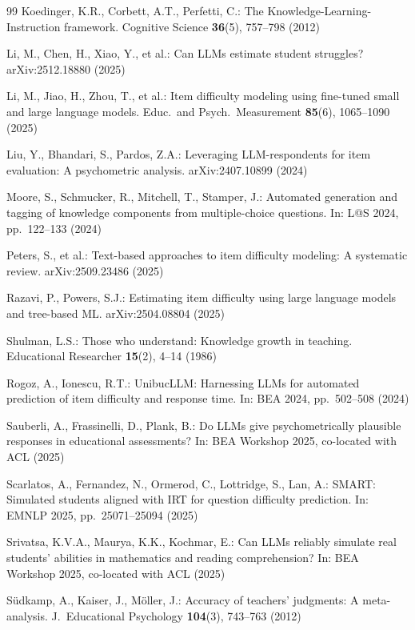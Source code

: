 \documentclass[runningheads]{llncs}
\begin{document}
\begin{thebibliography}{99}
Koedinger, K.R., Corbett, A.T., Perfetti, C.: The Knowledge-Learning-Instruction framework. Cognitive Science \textbf{36}(5), 757--798 (2012)

Li, M., Chen, H., Xiao, Y., et al.: Can LLMs estimate student struggles? arXiv:2512.18880 (2025)

Li, M., Jiao, H., Zhou, T., et al.: Item difficulty modeling using fine-tuned small and large language models. Educ.\ and Psych.\ Measurement \textbf{85}(6), 1065--1090 (2025)

Liu, Y., Bhandari, S., Pardos, Z.A.: Leveraging LLM-respondents for item evaluation: A psychometric analysis. arXiv:2407.10899 (2024)

Moore, S., Schmucker, R., Mitchell, T., Stamper, J.: Automated generation and tagging of knowledge components from multiple-choice questions. In: L@S 2024, pp.\ 122--133 (2024)

Peters, S., et al.: Text-based approaches to item difficulty modeling: A systematic review. arXiv:2509.23486 (2025)

Razavi, P., Powers, S.J.: Estimating item difficulty using large language models and tree-based ML. arXiv:2504.08804 (2025)

Shulman, L.S.: Those who understand: Knowledge growth in teaching. Educational Researcher \textbf{15}(2), 4--14 (1986)

Rogoz, A., Ionescu, R.T.: UnibucLLM: Harnessing LLMs for automated prediction of item difficulty and response time. In: BEA 2024, pp.\ 502--508 (2024)

Sauberli, A., Frassinelli, D., Plank, B.: Do LLMs give psychometrically plausible responses in educational assessments? In: BEA Workshop 2025, co-located with ACL (2025)

Scarlatos, A., Fernandez, N., Ormerod, C., Lottridge, S., Lan, A.: SMART: Simulated students aligned with IRT for question difficulty prediction. In: EMNLP 2025, pp.\ 25071--25094 (2025)

Srivatsa, K.V.A., Maurya, K.K., Kochmar, E.: Can LLMs reliably simulate real students' abilities in mathematics and reading comprehension? In: BEA Workshop 2025, co-located with ACL (2025)

S\"udkamp, A., Kaiser, J., M\"oller, J.: Accuracy of teachers' judgments: A meta-analysis. J.\ Educational Psychology \textbf{104}(3), 743--763 (2012)


\end{thebibliography}
\end{document}
